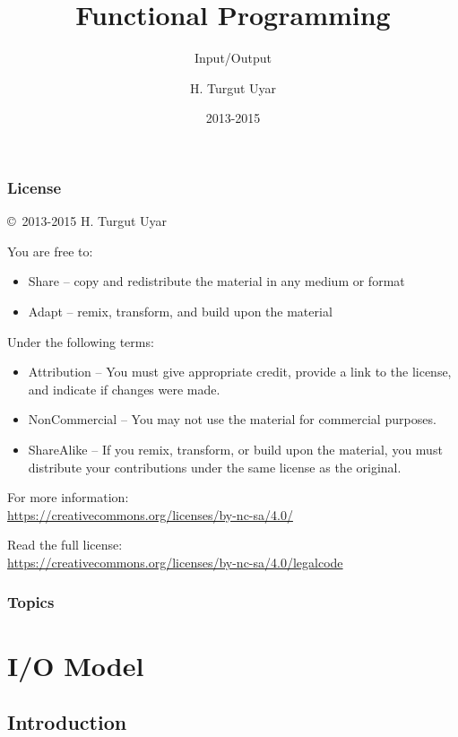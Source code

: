 \documentclass[dvipsnames]{beamer}
\title{Functional Programming}
\subtitle{Input/Output}
\author{H. Turgut Uyar}
\date{2013-2015}
\theoremstyle{plain}
\begin{document}
\begin{frame}
  \titlepage
\end{frame}

\begin{frame}
  \frametitle{License}

  \hfill
  \copyright~2013-2015 H. Turgut Uyar

  \vfill
  \begin{footnotesize}
    You are free to:
    \begin{itemize}
      \itemsep0em
      \item Share -- copy and redistribute the material in any medium or format
      \item Adapt -- remix, transform, and build upon the material
    \end{itemize}

    Under the following terms:
    \begin{itemize}
      \itemsep0em
      \item Attribution -- You must give appropriate credit, provide a link to
        the license, and indicate if changes were made.

      \item NonCommercial -- You may not use the material for commercial
        purposes.

      \item ShareAlike -- If you remix, transform, or build upon the material,
        you must distribute your contributions under the same license as the
        original.
    \end{itemize}

    For more information:\\
    \url{https://creativecommons.org/licenses/by-nc-sa/4.0/}

    \smallskip
    Read the full license:\\
    \url{https://creativecommons.org/licenses/by-nc-sa/4.0/legalcode}
  \end{footnotesize}
\end{frame}

\begin{frame}
  \frametitle{Topics}
  \tableofcontents
\end{frame}

\section{I/O Model}

\subsection{Introduction}
\end{document}
